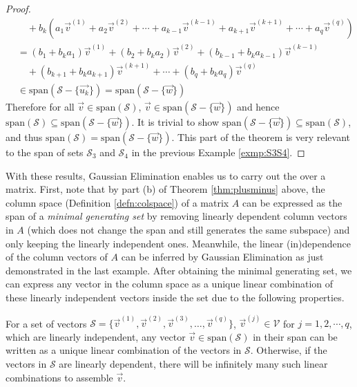 \begin{proof}
\begin{align*}
&\quad + b_k(a_1\vec{v}^{(1)} + a_2\vec{v}^{(2)} + \cdots + a_{k-1}\vec{v}^{(k-1)} + a_{k+1}\vec{v}^{(k+1)} + \cdots + a_q\vec{v}^{(q)}) \\
&= (b_1 + b_ka_1) \vec{v}^{(1)} + (b_2 + b_ka_2) \vec{v}^{(2)} + (b_{k-1} + b_ka_{k-1})\vec{v}^{(k-1)} \\
&\quad + (b_{k+1} + b_ka_{k+1}) \vec{v}^{(k+1)} + \cdots + (b_q + b_ka_q)\vec{v}^{(q)} \\
&\in \text{span}(\mathcal{S} - \{\vec{u_k}\}) = \text{span}(\mathcal{S} - \{\vec{w}\})
\end{align*}
Therefore for all $\vec{v} \in \text{span}(\mathcal{S})$, $\vec{v} \in \text{span}(\mathcal{S} - \{\vec{w}\})$ and hence $\text{span}(\mathcal{S}) \subseteq \text{span}(\mathcal{S} - \{\vec{w}\})$. It is trivial to show $\text{span}(\mathcal{S} - \{\vec{w}\}) \subseteq \text{span}(\mathcal{S})$, and thus $\text{span}(\mathcal{S}) = \text{span}(\mathcal{S} - \{\vec{w}\})$. This part of the theorem is very relevant to the span of sets $\mathcal{S}_3$ and $\mathcal{S}_4$ in the previous Example \ref{exmp:S3S4}.
\end{proof}
\newpage
With these results, Gaussian Elimination enables us to carry out the  over a matrix. First, note that by part (b) of Theorem \ref{thm:plusminus} above, the column space (Definition \ref{defn:colspace}) of a matrix $A$ can be expressed as the span of a \textit{minimal generating set} by removing linearly dependent column vectors in $A$ (which does not change the span and still generates the same subspace) and only keeping the linearly independent ones. Meanwhile, the linear (in)dependence of the column vectors of $A$ can be inferred by Gaussian Elimination as just demonstrated in the last example. After obtaining the minimal generating set, we can express any vector in the column space as a unique linear combination of these linearly independent vectors inside the set due to the following properties.
\begin{proper}
\label{proper:lincombofspan}
For a set of vectors $\mathcal{S} = \{\vec{v}^{(1)}, \vec{v}^{(2)}, \vec{v}^{(3)}, \ldots, \vec{v}^{(q)}\}$, $\vec{v}^{(j)} \in \mathcal{V}$ for $j = 1,2,\cdots,q$, which are linearly independent, any vector $\vec{v} \in \text{span}(\mathcal{S})$ in their span can be written as a unique linear combination of the vectors in $\mathcal{S}$. Otherwise, if the vectors in $\mathcal{S}$ are linearly dependent, there will be infinitely many such linear combinations to assemble $\vec{v}$.
\end{proper}
